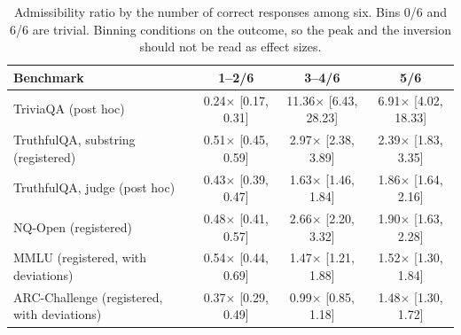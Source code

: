 \begin{table}[h]
\centering
\footnotesize
\setlength{\tabcolsep}{3pt}
\begin{tabular}{lccc}
\toprule
Benchmark & 1--2/6 & 3--4/6 & 5/6 \\
\midrule
TriviaQA (post hoc) & 0.24$\times$ [0.17, 0.31] & 11.36$\times$ [6.43, 28.23] & 6.91$\times$ [4.02, 18.33] \\
TruthfulQA, substring (registered) & 0.51$\times$ [0.45, 0.59] & 2.97$\times$ [2.38, 3.89] & 2.39$\times$ [1.83, 3.35] \\
TruthfulQA, judge (post hoc) & 0.43$\times$ [0.39, 0.47] & 1.63$\times$ [1.46, 1.84] & 1.86$\times$ [1.64, 2.16] \\
NQ-Open (registered) & 0.48$\times$ [0.41, 0.57] & 2.66$\times$ [2.20, 3.32] & 1.90$\times$ [1.63, 2.28] \\
MMLU (registered, with deviations) & 0.54$\times$ [0.44, 0.69] & 1.47$\times$ [1.21, 1.88] & 1.52$\times$ [1.30, 1.84] \\
ARC-Challenge (registered, with deviations) & 0.37$\times$ [0.29, 0.49] & 0.99$\times$ [0.85, 1.18] & 1.48$\times$ [1.30, 1.72] \\
\bottomrule
\end{tabular}
\caption{Admissibility ratio by the number of correct responses among six. Bins 0/6 and 6/6 are trivial. Binning conditions on the outcome, so the peak and the inversion should not be read as effect sizes.}
\label{tab:pred3-bins}
\end{table}
